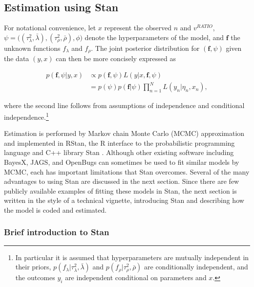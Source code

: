  \subsection{Estimation using Stan}
 \label{stan_intro}

For notational convenience, let $x$ represent the observed $n$ and $v^{RATIO}$, 
$\psi = \big((\tau^2_\lambda, \bar{\lambda}), (\tau^2_\rho, \bar{\rho}), \phi \big)$ denote 
the hyperparameters of the model, and $\bm{f}$ the unknown functions  $f_\lambda$ and 
$f_\rho$. The joint posterior distribution for $(\bm{f}, \psi)$ given the data $(y, x)$ can then 
be more concisely expressed as 

\begin{align*}
p(\bm{f}, \psi | y, x) 
&\propto p(\bm{f}, \psi)  L(y | x, \bm{f}, \psi)  \\
&=p(\psi)  p(\bm{f} | \psi)   \prod_{n=1}^N L(y_n | \eta_n, x_n), 
\end{align*}

\noindent where the second line follows from assumptions of independence and conditional 
independence.\footnote{In particular it is assumed that hyperparameters are mutually independent 
in their priors, $p(f_\lambda | \tau^2_\lambda, \bar{\lambda})$ and $p(f_\rho | \tau^2_\rho, \bar{\rho})$ 
are conditionally independent, and the outcomes $y_i$ are independent conditional on parameters 
and $x$.}

Estimation is performed by Markov chain Monte Carlo (MCMC) approximation and implemented in 
RStan, the R interface to the probabilistic programming language and C++ library Stan 
. Although other existing software including BayesX, JAGS, and 
OpenBugs can sometimes be used to fit similar models by MCMC, each has important limitations 
that Stan overcomes. Several of the many advantages to using Stan are discussed in the next section. 
Since there are few publicly available examples of fitting these models in Stan, the next section is 
written in the style of a technical vignette, introducing Stan and describing how the model is coded 
and estimated. 

\subsubsection{Brief introduction to Stan}

